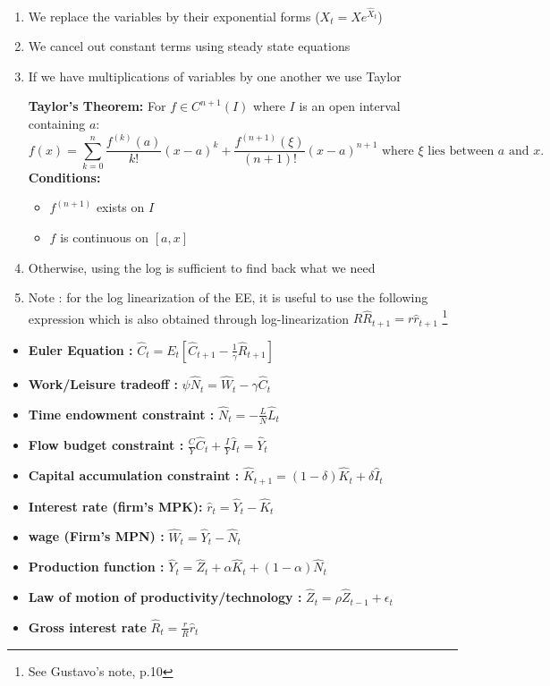 \documentclass{article}
\begin{document}
    \begin{enumerate}
        \item We replace the variables by their exponential forms ($X_t = Xe^{\hat{X}_t}$)
        \item We cancel out constant terms using steady state equations
        \item If we have multiplications of variables by one another we use Taylor 
        \begin{taylorbox}
            \textbf{Taylor's Theorem:} For \(f \in C^{n+1}(I)\) where \(I\) is an open interval containing \(a\):
            \[f(x) = \sum_{k=0}^{n} \frac{f^{(k)}(a)}{k!}(x-a)^k + \frac{f^{(n+1)}(\xi)}{(n+1)!}(x-a)^{n+1}\text{ where \(\xi\) lies between \(a\) and \(x\).}\]
            \textbf{Conditions:}
            \begin{itemize}
            \item \(f^{(n+1)}\) exists on \(I\)
            \item \(f\) is continuous on \([a,x]\)
            \end{itemize}
        \end{taylorbox}
        \item Otherwise, using the log is sufficient to find back what we need
        \item Note : for the log linearization of the EE, it is useful to use the following expression which is also obtained through log-linearization $R\hat{R}_{t+1} = r\hat{r}_{t+1}$ \footnote{See Gustavo's note, p.10}
\end{enumerate}
\begin{LLbox}
    \begin{itemize}
        \item \textbf{Euler Equation :} $\hat{C}_t=E_t[\hat{C}_{t+1}-\frac{1}{\gamma}\hat{R}_{t+1}] $
        \item \textbf{Work/Leisure tradeoff :} $\psi \hat{N}_t = \hat{W}_t-\gamma\hat{C}_t$
        \item \textbf{Time endowment constraint :} $\hat{N}_t=-\frac{L}{N}\hat{L}_t$
        \item \textbf{Flow budget constraint :} $\frac{C}{Y}\hat{C}_t+\frac{I}{Y}\hat{I}_t=\hat{Y}_t$ 
        \item \textbf{Capital accumulation constraint :} $\hat{K}_{t+1}=(1-\delta)\hat{K}_t+\delta\hat{I}_t$
        \item \textbf{Interest rate (firm's MPK):} $\hat{r}_t=\hat{Y}_t-\hat{K}_t$
        \item \textbf{wage (Firm's MPN) :} $\hat{W}_t=\hat{Y}_t-\hat{N}_t$ 
        \item \textbf{Production function :} $\hat{Y}_t=\hat{Z}_t+\alpha\hat{K}_t+(1-\alpha)\hat{N}_t$
        \item \textbf{Law of motion of productivity/technology :} $\hat{Z}_t=\rho\hat{Z}_{t-1}+\epsilon_t$ \footnotemark
        \item \textbf{Gross interest rate} $\hat{R}_t=\frac{r}{R}\hat{r}_t$
    \end{itemize}
\end{LLbox}
\end{document}
